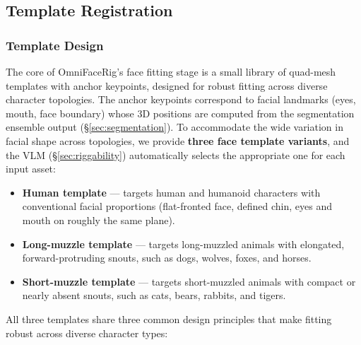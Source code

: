 \documentclass[acmtog,anonymous,review]{acmart}
\begin{document}
\subsection{Template Registration}
\label{sec:fitting}

\subsubsection{Template Design}

The core of OmniFaceRig's face fitting stage is a small library of quad-mesh templates with anchor keypoints, designed for robust fitting across diverse character topologies. The anchor keypoints correspond to facial landmarks (eyes, mouth, face boundary) whose 3D positions are computed from the segmentation ensemble output (\S\ref{sec:segmentation}). To accommodate the wide variation in facial shape across topologies, we provide \textbf{three face template variants}, and the VLM (\S\ref{sec:riggability}) automatically selects the appropriate one for each input asset:

\begin{itemize}
  \item \textbf{Human template} --- targets human and humanoid characters with conventional facial proportions (flat-fronted face, defined chin, eyes and mouth on roughly the same plane).
  \item \textbf{Long-muzzle template} --- targets long-muzzled animals with elongated, forward-protruding snouts, such as dogs, wolves, foxes, and horses.
  \item \textbf{Short-muzzle template} --- targets short-muzzled animals with compact or nearly absent snouts, such as cats, bears, rabbits, and tigers.
\end{itemize}

All three templates share three common design principles that make fitting robust across diverse character types:
\end{document}
